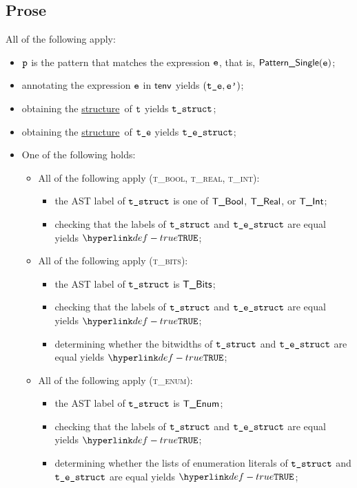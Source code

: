 \documentclass{book}
\newcommand\ProseOrTypeError[0]{\ProseTerminateAs{\TypeErrorConfig}}
\newcommand\structure[0]{\hyperlink{def-structure}{structure}}
\begin{document}
\subsection{Prose}
All of the following apply:
\begin{itemize}
  \item $\texttt{p}$ is the pattern that matches the expression $\texttt{e}$, that is, $\textsf{Pattern\_Single}(\texttt{e})$;
  \item annotating the expression $\texttt{e}$ in $\textsf{tenv}$ yields $(\texttt{t\_e}, \texttt{e'})$\ProseOrTypeError;
  \item obtaining the \structure\ of $\texttt{t}$ yields $\texttt{t\_struct}$\ProseOrTypeError;
  \item obtaining the \structure\ of $\texttt{t\_e}$ yields $\texttt{t\_e\_struct}$\ProseOrTypeError;
  \item One of the following holds:
  \begin{itemize}
    \item All of the following apply (\textsc{t\_bool, t\_real, t\_int}):
    \begin{itemize}
      \item the AST label of $\texttt{t\_struct}$ is one of $\textsf{T\_Bool}$, $\textsf{T\_Real}$, or $\textsf{T\_Int}$;
      \item checking that the labels of $\texttt{t\_struct}$ and $\texttt{t\_e\_struct}$ are equal yields $\True$\ProseOrTypeError;
    \end{itemize}

    \item All of the following apply (\textsc{t\_bits}):
    \begin{itemize}
      \item the AST label of $\texttt{t\_struct}$ is $\textsf{T\_Bits}$;
      \item checking that the labels of $\texttt{t\_struct}$ and $\texttt{t\_e\_struct}$ are equal yields $\True$\ProseOrTypeError;
      \item determining whether the bitwidths of $\texttt{t\_struct}$ and $\texttt{t\_e\_struct}$ are equal yields $\True$\ProseOrTypeError;
    \end{itemize}

    \item All of the following apply (\textsc{t\_enum}):
    \begin{itemize}
      \item the AST label of $\texttt{t\_struct}$ is $\textsf{T\_Enum}$;
      \item checking that the labels of $\texttt{t\_struct}$ and $\texttt{t\_e\_struct}$ are equal yields $\True$\ProseOrTypeError;
      \item determining whether the lists of enumeration literals of $\texttt{t\_struct}$ and $\texttt{t\_e\_struct}$ are equal yields $\True$\ProseOrTypeError;
    \end{itemize}


\end{itemize}
\end{itemize}
\end{document}
